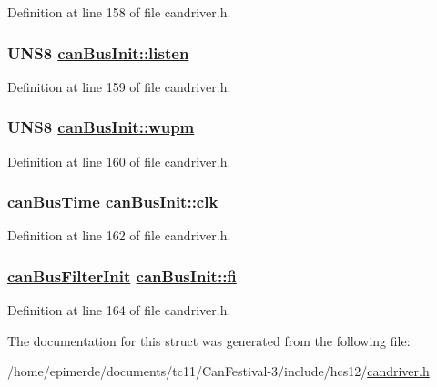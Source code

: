 Definition at line 158 of file candriver.h.\hypertarget{structcanBusInit_9b6d43ba9be72e1f21e234d50a1676d6}{
\subsubsection[listen]{\setlength{\rightskip}{0pt plus 5cm}UNS8 \hyperlink{structcanBusInit_9b6d43ba9be72e1f21e234d50a1676d6}{can\-Bus\-Init::listen}}}
\label{structcanBusInit_9b6d43ba9be72e1f21e234d50a1676d6}




Definition at line 159 of file candriver.h.\hypertarget{structcanBusInit_ae0d3c3a91c165a0d782ff40be2e8e29}{
\subsubsection[wupm]{\setlength{\rightskip}{0pt plus 5cm}UNS8 \hyperlink{structcanBusInit_ae0d3c3a91c165a0d782ff40be2e8e29}{can\-Bus\-Init::wupm}}}
\label{structcanBusInit_ae0d3c3a91c165a0d782ff40be2e8e29}




Definition at line 160 of file candriver.h.\hypertarget{structcanBusInit_fc9eb7ca2f89001dca552e3f956beb73}{
\subsubsection[clk]{\setlength{\rightskip}{0pt plus 5cm}\hyperlink{structcanBusTime}{can\-Bus\-Time} \hyperlink{structcanBusInit_fc9eb7ca2f89001dca552e3f956beb73}{can\-Bus\-Init::clk}}}
\label{structcanBusInit_fc9eb7ca2f89001dca552e3f956beb73}




Definition at line 162 of file candriver.h.\hypertarget{structcanBusInit_ea84b860ae3e0e636b78d1c83e916ea0}{
\subsubsection[fi]{\setlength{\rightskip}{0pt plus 5cm}\hyperlink{structcanBusFilterInit}{can\-Bus\-Filter\-Init} \hyperlink{structcanBusInit_ea84b860ae3e0e636b78d1c83e916ea0}{can\-Bus\-Init::fi}}}
\label{structcanBusInit_ea84b860ae3e0e636b78d1c83e916ea0}




Definition at line 164 of file candriver.h.

The documentation for this struct was generated from the following file:\begin{CompactItemize}
\item 
/home/epimerde/documents/tc11/Can\-Festival-3/include/hcs12/\hyperlink{candriver_8h}{candriver.h}\end{CompactItemize}
